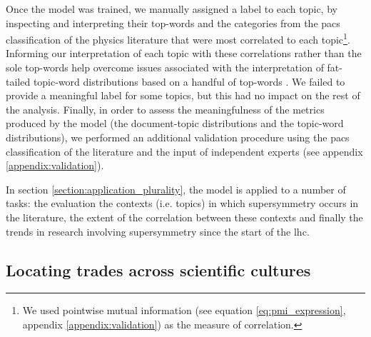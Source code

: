\documentclass[smallextended]{svjour3}
\begin{document}
Once the model was trained, we manually assigned a label to each topic, by inspecting and interpreting their top-words and the categories from the \gls{pacs} classification of the physics literature that were most correlated to each topic\footnote{We used pointwise mutual information (see equation \ref{eq:pmi_expression}, appendix \ref{appendix:validation}) as the measure of correlation.}. Informing our interpretation of each topic with these correlations rather than the sole top-words help overcome issues associated with the interpretation of fat-tailed topic-word distributions based on a handful of top-words \citep{Chang2009,Allen2022}.  We failed to provide a meaningful label for some topics, but this had no impact on the rest of the analysis. Finally, in order to assess the meaningfulness of the metrics produced by the model (the document-topic distributions and the topic-word distributions), we performed an additional validation procedure using the \gls{pacs} classification of the literature and the input of independent experts (see appendix \ref{appendix:validation}). 

In section \ref{section:application_plurality}, the model is applied to a number of tasks: the evaluation the contexts (i.e. topics) in which supersymmetry occurs in the literature, the extent of the correlation between these contexts and finally the trends in research involving supersymmetry since the start of the \gls{lhc}.

\subsection{Locating trades across scientific cultures}\label{section:method_trading_zone}
\end{document}
